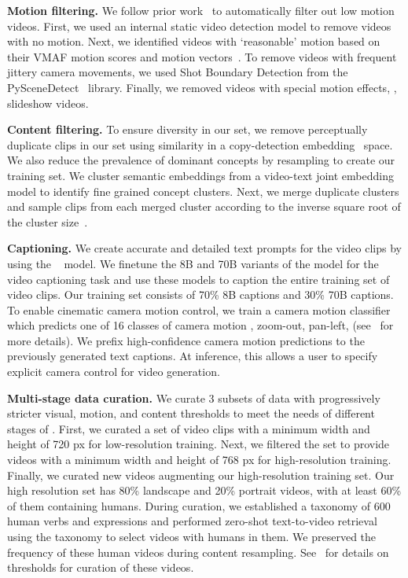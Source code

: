 \textbf{Motion filtering.}
We follow prior work~\citep{emuvideo2023} to automatically filter out low motion videos.
First, we used an internal static video detection model to remove videos with no motion.
Next, we identified videos with `reasonable' motion based on their VMAF motion scores and motion vectors~\citep{ffmpeg}.
To remove videos with frequent jittery camera movements, we used Shot Boundary Detection from the PySceneDetect~\citep{pyscenedetect} library.
Finally, we removed videos with special motion effects, \eg, slideshow videos.

\textbf{Content filtering.}
To ensure diversity in our \pretraining set, we remove perceptually duplicate clips in our \pretraining set using similarity in a copy-detection embedding~\citep{pizzi2022self} space.
We also reduce the prevalence of dominant concepts by resampling to create our training set.
We cluster semantic embeddings from a video-text joint embedding model
to identify fine grained concept clusters.
Next, we merge duplicate clusters and sample clips from each merged cluster according to the inverse square root of the cluster size~\citep{mahajan2018exploring}.


\textbf{Captioning.}
We create accurate and detailed text prompts for the video clips by using the \llamaVideo~\citep{llama3} model.
We finetune the 8B and 70B variants of the model for the video captioning task and use these models to caption the entire training set of video clips.
Our training set consists of 70\% 8B captions and 30\% 70B captions.
To enable cinematic camera motion control, we train a camera motion classifier which predicts one of 16 classes of camera motion \eg, zoom-out, pan-left, \etc (see~ for more details).
We prefix high-confidence camera motion predictions to the previously generated text captions.
At inference, this allows a user to specify explicit camera control for video generation.








\textbf{Multi-stage data curation.}
We curate 3 subsets of \pretraining data with progressively stricter visual, motion, and content thresholds to meet the needs of different stages of \pretraining.
First, we curated a set of video clips with a minimum width and height of 720 px for low-resolution training.
Next, we filtered the set to provide videos with a minimum width and height of 768 px for high-resolution training.
Finally, we curated new videos augmenting our high-resolution training set.
Our high resolution set has 80\% landscape and 20\% portrait videos, with at least 60\% of them containing humans. During curation, we established a taxonomy of 600 human verbs and expressions and performed zero-shot text-to-video retrieval using the taxonomy to select videos with humans in them.
We preserved the frequency of these human videos during content resampling. See~ for details on thresholds for curation of these videos.

